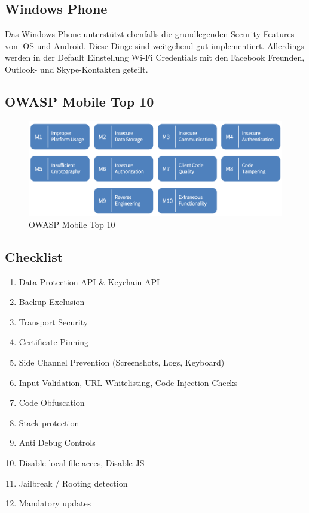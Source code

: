 \subsection{Windows Phone}
Das Windows Phone unterstützt ebenfalls die grundlegenden Security Features von iOS und Android. Diese Dinge sind weitgehend gut implementiert. Allerdings werden in der Default Einstellung Wi-Fi Credentials mit den Facebook Freunden, Outlook- und Skype-Kontakten geteilt.

\newpage

\subsection{OWASP Mobile Top 10}
\begin{figure}[h!]
	\centering
	\includegraphics[width=0.7\linewidth]{images/owasp_mobile_10}
	\caption{OWASP Mobile Top 10}
	\label{fig:owaspmobile10}
\end{figure}

\subsection{Checklist}
\begin{enumerate}
	\item Data Protection API \& Keychain API
	\item Backup Exclusion
	\item Transport Security
	\item Certificate Pinning
	\item Side Channel Prevention (Screenshots, Logs, Keyboard)
	\item Input Validation, URL Whitelisting, Code Injection Checks
	\item Code Obfuscation
	\item Stack protection
	\item Anti Debug Controls
	\item Disable local file acces, Disable JS
	\item Jailbreak / Rooting detection
	\item Mandatory updates
\end{enumerate}

